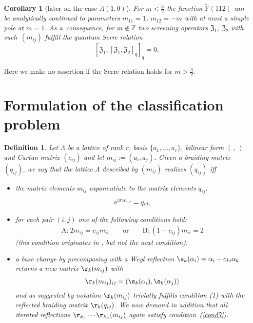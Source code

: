 \documentclass[pdftex]{sigma}%
\numberwithin{equation}{section}
\newtheorem{cor}[teo]{Corollary}
\newtheorem{defin}[teo]{Definition}
\newcommand{\Z}{\mathbb{Z}}
\newcommand{\zem}{\mathfrak{Z}}
\newcommand{\rFp}{\tilde{\mathrm{F}}}
\begin{document}
\begin{cor}[later-on the case $A(1,0)$]\label{cor_A10}
For $m<\frac{3}{2}$ the function $\rFp(112)$ can be analytically continued to parameters $m_{11}=1$, $m_{12}=-m$ with at most a simple pole at $m=1$. As a~consequence, for $m\not\in \Z$ two screening operators $\zem_1$, $\zem_2$ with such~$(m_{ij})$ fulfill the quantum Serre relation
	\[[\zem_1,[\zem_1,\zem_2]_q]_q=0.\]
\end{cor}

Here we make no assertion if the Serre relation holds for $m>\frac{3}{2}$.

\section{Formulation of the classification problem}\label{section5}
\begin{defin}\label{Mm} Let $\Lambda$ be a lattice of rank $r$, basis $\{a_1, \dots, a_r\}$, bilinear form $(\,,\,)$ and Cartan matrix $(c_{ij})$ and let $m_{ij}:=(a_i, a_j)$. Given a braiding matrix $(q_{ij})$, we say that the lattice $\Lambda$ described by $(m_{ij})$ \emph{realizes} $(q_{ij})$ iff
\begin{itemize}\itemsep=0pt
	\item the matrix elements $m_{ij}$ exponentiate to the matrix elements $q_{ij}$:
	\[{\rm e}^{{\rm i}\pi m_{ij}} = q_{ij},\]
	\item for each pair $(i,j)$ one of the following conditions hold: \begin{align}\label{cond7}
\text{A:} \ 2m_{ij} = c_{ij} m_{ii} \qquad \text{or} \qquad \text{B:} \ (1-c_{ij})m_{ii} = 2
\end{align}
(this condition originates in \cite{Sem14}, but not the next condition),
	\item a base change by precomposing with a Weyl reflection $\s_k(\alpha_i)=\alpha_i-c_{ki}\alpha_k$
	returns a new matrix $\r_k(m_{ij})$ with
	\[\r_k(m_{ij})_{ij}=(\s_k(\alpha_i),\s_k(\alpha_j))\]
	and as suggested by notation $\r_k(m_{ij})$ trivially fulfills condition (1) with the reflected braiding matrix $\r_k(q_{ij})$.
 We now demand in addition that all iterated reflections $\r_{k_1}\cdots\r_{k_n}(m_{ij})$ again satisfy condition~(\ref{cond7}).
\end{itemize}
\end{defin}
\end{document}
